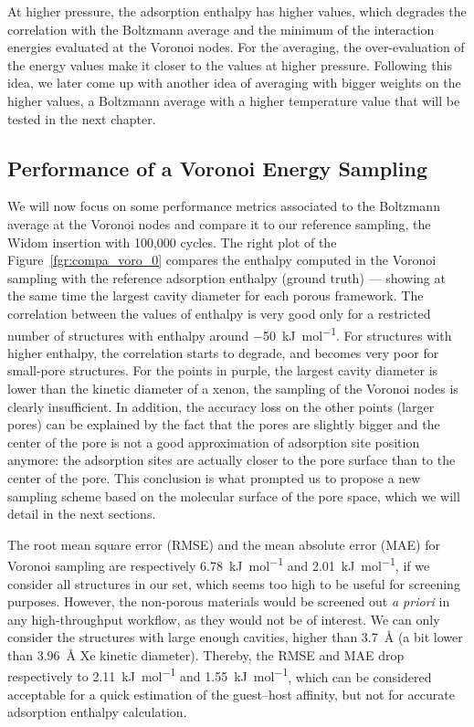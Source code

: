 \documentclass[main]{subfiles}
\begin{document}
At higher pressure, the adsorption enthalpy has higher values, which degrades the correlation with the Boltzmann average and the minimum of the interaction energies evaluated at the Voronoi nodes. For the averaging, the over-evaluation of the energy values make it closer to the values at higher pressure. Following this idea, we later come up with another idea of averaging with bigger weights on the higher values, a Boltzmann average with a higher temperature value that will be tested in the next chapter. 

\subsection{Performance of a Voronoi Energy Sampling}

We will now focus on some performance metrics associated to the Boltzmann average at the Voronoi nodes and compare it to our reference sampling, the Widom insertion with 100,000 cycles. The right plot of the Figure~\ref{fgr:compa_voro_0} compares the enthalpy computed in the Voronoi sampling with the reference adsorption enthalpy (ground truth) --- showing at the same time the largest cavity diameter for each porous framework. The correlation between the values of enthalpy is very good only for a restricted number of structures with enthalpy around \SI{-50}{\kilo\joule\per\mole}. For structures with higher enthalpy, the correlation starts to degrade, and becomes very poor for small-pore structures. For the points in purple, the largest cavity diameter is lower than the kinetic diameter of a xenon, the sampling of the Voronoi nodes is clearly insufficient. In addition, the accuracy loss on the other points (larger pores) can be explained by the fact that the pores are slightly bigger and the center of the pore is not a good approximation of adsorption site position anymore: the adsorption sites are actually closer to the pore surface than to the center of the pore. This conclusion is what prompted us to propose a new sampling scheme based on the molecular surface of the pore space, which we will detail in the next sections.

The root mean square error (RMSE) {and the mean absolute error (MAE) for Voronoi sampling are respectively \SI{6.78}{\kilo\joule\per\mole} and \SI{2.01}{\kilo\joule\per\mole}}, if we consider all structures in our set, which seems too high to be useful for screening purposes. However, the non-porous materials would be screened out \emph{a priori} in any high-throughput workflow, as they would not be of interest. We can only consider the structures with large enough cavities, higher than \SI{3.7}{\angstrom} (a bit lower than \SI{3.96}{\angstrom} Xe kinetic diameter). Thereby, {the RMSE and MAE drop respectively to \SI{2.11}{\kilo\joule\per\mole} and \SI{1.55}{\kilo\joule\per\mole}}, which can be considered acceptable for a quick estimation of the guest--host affinity, but not for accurate adsorption enthalpy calculation.
\end{document}
